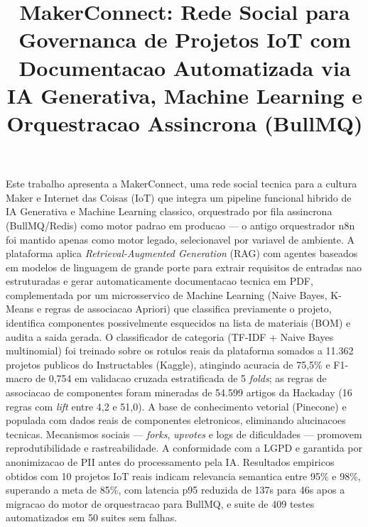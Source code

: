 \documentclass[portuguese]{sbcreviews-2025}%
\title[Rede Social Maker com Governanca IoT, IA Generativa e Machine Learning]{MakerConnect: Rede Social para Governanca de Projetos IoT com Documentacao Automatizada via IA Generativa, Machine Learning e Orquestracao Assincrona (BullMQ)}
\author[Froes 2026]{
\affil{\textbf{Vinicius Froes}~\orcidlink{0000-0000-0000-0000}~\textcolor{blue}{\faEnvelope}~~[{Catolica de Santa Catarina}~|\href{mailto:vinicius.froes@catolicasc.edu.br}{~{\textit{vinicius.froes@catolicasc.edu.br}}}~]}
}
\begin{document}
\begin{frontmatter}
\maketitle

\begin{abstract-pt}
Este trabalho apresenta a MakerConnect, uma rede social tecnica para a cultura Maker e Internet das Coisas (IoT) que integra um pipeline funcional hibrido de IA Generativa e Machine Learning classico, orquestrado por fila assincrona (BullMQ/Redis) como motor padrao em producao --- o antigo orquestrador n8n foi mantido apenas como motor legado, selecionavel por variavel de ambiente. A plataforma aplica \textit{Retrieval-Augmented Generation} (RAG) com agentes baseados em modelos de linguagem de grande porte para extrair requisitos de entradas nao estruturadas e gerar automaticamente documentacao tecnica em PDF, complementada por um microsservico de Machine Learning (Naive Bayes, K-Means e regras de associacao Apriori) que classifica previamente o projeto, identifica componentes possivelmente esquecidos na lista de materiais (BOM) e audita a saida gerada. O classificador de categoria (TF-IDF + Naive Bayes multinomial) foi treinado sobre os rotulos reais da plataforma somados a 11.362 projetos publicos do Instructables (Kaggle), atingindo acuracia de 75,5\% e F1-macro de 0,754 em validacao cruzada estratificada de 5 \textit{folds}; as regras de associacao de componentes foram mineradas de 54.599 artigos da Hackaday (16 regras com \textit{lift} entre 4,2 e 51,0). A base de conhecimento vetorial (Pinecone) e populada com dados reais de componentes eletronicos, eliminando alucinacoes tecnicas. Mecanismos sociais --- \textit{forks}, \textit{upvotes} e logs de dificuldades --- promovem reprodutibilidade e rastreabilidade. A conformidade com a LGPD e garantida por anonimizacao de PII antes do processamento pela IA. Resultados empiricos obtidos com 10 projetos IoT reais indicam relevancia semantica entre 95\% e 98\%, superando a meta de 85\%, com latencia p95 reduzida de 137s para 46s apos a migracao do motor de orquestracao para BullMQ, e suite de 409 testes automatizados em 50 suites sem falhas.
\end{abstract-pt}


\end{frontmatter}
\end{document}
